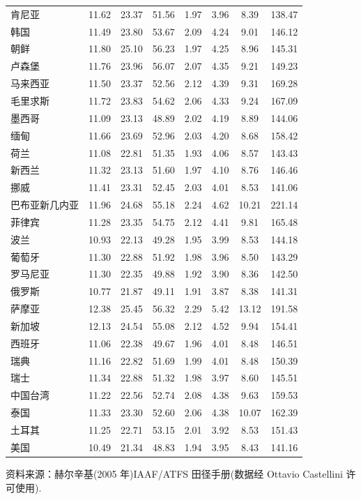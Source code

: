 \begin{mvtable}
\begin{longtable}{lccccccc}
肯尼亚 & 11.62 & 23.37 & 51.56 & 1.97 & 3.96 & 8.39 & 138.47 \\
韩国 & 11.49 & 23.80 & 53.67 & 2.09 & 4.24 & 9.01 & 146.12 \\
朝鲜 & 11.80 & 25.10 & 56.23 & 1.97 & 4.25 & 8.96 & 145.31 \\
卢森堡 & 11.76 & 23.96 & 56.07 & 2.07 & 4.35 & 9.21 & 149.23 \\
马来西亚 & 11.50 & 23.37 & 52.56 & 2.12 & 4.39 & 9.31 & 169.28 \\
毛里求斯 & 11.72 & 23.83 & 54.62 & 2.06 & 4.33 & 9.24 & 167.09 \\
墨西哥 & 11.09 & 23.13 & 48.89 & 2.02 & 4.19 & 8.89 & 144.06 \\
缅甸 & 11.66 & 23.69 & 52.96 & 2.03 & 4.20 & 8.68 & 158.42 \\
荷兰 & 11.08 & 22.81 & 51.35 & 1.93 & 4.06 & 8.57 & 143.43 \\
新西兰 & 11.32 & 23.13 & 51.60 & 1.97 & 4.10 & 8.76 & 146.46 \\
挪威 & 11.41 & 23.31 & 52.45 & 2.03 & 4.01 & 8.53 & 141.06 \\
巴布亚新几内亚 & 11.96 & 24.68 & 55.18 & 2.24 & 4.62 & 10.21 & 221.14 \\
菲律宾 & 11.28 & 23.35 & 54.75 & 2.12 & 4.41 & 9.81 & 165.48 \\
波兰 & 10.93 & 22.13 & 49.28 & 1.95 & 3.99 & 8.53 & 144.18 \\
葡萄牙 & 11.30 & 22.88 & 51.92 & 1.98 & 3.96 & 8.50 & 143.29 \\
罗马尼亚 & 11.30 & 22.35 & 49.88 & 1.92 & 3.90 & 8.36 & 142.50 \\
俄罗斯 & 10.77 & 21.87 & 49.11 & 1.91 & 3.87 & 8.38 & 141.31 \\
萨摩亚 & 12.38 & 25.45 & 56.32 & 2.29 & 5.42 & 13.12 & 191.58 \\
新加坡 & 12.13 & 24.54 & 55.08 & 2.12 & 4.52 & 9.94 & 154.41 \\
西班牙 & 11.06 & 22.38 & 49.67 & 1.96 & 4.01 & 8.48 & 146.51 \\
瑞典 & 11.16 & 22.82 & 51.69 & 1.99 & 4.01 & 8.48 & 150.39 \\
瑞士 & 11.34 & 22.88 & 51.32 & 1.98 & 3.97 & 8.60 & 145.51 \\
中国台湾 & 11.22 & 22.56 & 52.74 & 2.08 & 4.38 & 9.63 & 159.53 \\
泰国 & 11.33 & 23.30 & 52.60 & 2.06 & 4.38 & 10.07 & 162.39 \\
土耳其 & 11.25 & 22.71 & 53.15 & 2.01 & 3.92 & 8.53 & 151.43 \\
美国 & 10.49 & 21.34 & 48.83 & 1.94 & 3.95 & 8.43 & 141.16 \\
\end{longtable}
\end{mvtable}

{ 资料来源：赫尔辛基(2005 年)IAAF/ATFS 田径手册(数据经 Ottavio Castellini 许可使用).}
